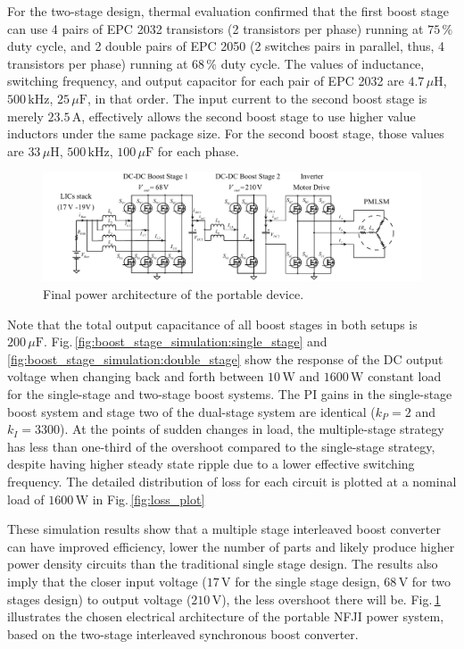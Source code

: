     
    For the two-stage design, thermal evaluation confirmed that the first boost stage can use 4 pairs of EPC 2032 transistors (2 transistors per phase) running at $75\,\%$ duty cycle, and 2 double pairs of EPC 2050 (2 switches pairs in parallel, thus, 4 transistors per phase) running at $68\,\%$ duty cycle. The values of inductance, switching frequency, and output capacitor for each pair of EPC 2032 are $4.7\,\mu\mathrm{H}$, $500\,\mathrm{kHz}$, $25\,\mu\mathrm{F}$, in that order. The input current to the second boost stage is merely $23.5\,\mathrm{A}$, effectively allows the second boost stage to use higher value inductors under the same package size. For the second boost stage, those values are $33\,\mu\mathrm{H}$, $500\,\mathrm{kHz}$, $100\,\mu\mathrm{F}$ for each phase. 
    
    
    \begin{figure}
      \centering
      \includegraphics[width=5.9in]{appA/images/Overall_eclectrical_architecture_v12.pdf}
      \caption{Final power architecture of the portable device.}
      \label{fig:final_design_architecture}
    \end{figure}
    
    Note that the total output capacitance of all boost stages in both setups is $200\,\mu\mathrm{F}$. Fig.\,\ref{fig:boost_stage_simulation:single_stage} and \ref{fig:boost_stage_simulation:double_stage} show the response of the DC output voltage when changing back and forth between $10\,\mathrm{W}$ and $1600\,\mathrm{W}$ constant load for the single-stage and two-stage boost systems. The PI gains in the single-stage boost system and stage two of the dual-stage system are identical ($k_P=2$ and $k_I=3300$). At the points of sudden changes in load, the multiple-stage strategy has less than one-third of the overshoot compared to the single-stage strategy, despite having higher steady state ripple due to a lower effective switching frequency. The detailed distribution of loss for each circuit is plotted at a nominal load of $1600\,\mathrm{W}$ in Fig.\,\ref{fig:loss_plot} 
    
    These simulation results show that a multiple stage interleaved boost converter can have improved efficiency, lower the number of parts and likely produce higher power density circuits than the traditional single stage design. The results also imply that the closer input voltage ($17\,\mathrm{V}$ for the single stage design, $68\,\mathrm{V}$ for two stages design) to output voltage ($210\,\mathrm{V}$), the less overshoot there will be. Fig.\,\ref{fig:final_design_architecture} illustrates the chosen electrical architecture of the portable NFJI power system, based on the two-stage interleaved synchronous boost converter. 
    
